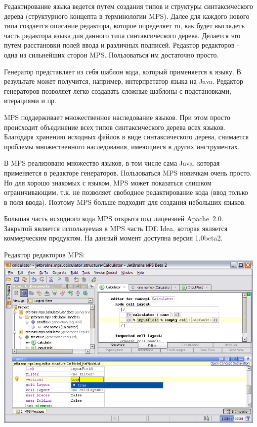 \documentclass[a4paper,12pt]{article}
\begin{document}
Редактирование языка ведется путем создания типов и структуры синтаксического
дерева (структурного концепта в терминологии MPS). Далее для каждого нового типа
создается описание редактора, которое определяет то, как будет выглядеть часть
редактора языка для данного типа синтаксического дерева. Делается это путем
расстановки полей ввода и различных подписей. Редактор редакторов - одна из
сильнейших сторон MPS. Пользоваться им достаточно просто.

Генератор представляет из себя шаблон кода, который применяется к языку. В
результате может получится, например, интерпретатор языка на Java. Редактор
генераторов позволяет легко создавать сложные шаблоны с подстановками,
итерациями и пр.

MPS поддерживает множественное наследование языков. При этом просто происходит 
объединение всех типов синтаксического дерева всех языков. Благодаря хранению
исходных файлов в виде синтаксического дерева, снимается проблемы
множественного наследования, имеющиеся в других инструментах.

В MPS реализовано множество языков, в том числе сама Java, которая применяется
в редакторе генераторов. Пользоваться MPS новичкам очень просто. Но для хорошо
знакомых с языком, MPS может показаться слишком ограничивающим, т.к. не позволяет
свободное редактирование кода (ввод только в поля ввода). Поэтому MPS больше
подходит для создания небольших языков.

Большая часть исходного кода MPS открыта под лицензией Apache~2.0. Закрытой
является используемая в MPS часть IDE Idea, которая является коммерческим
продуктом.
На данный момент доступна версия 1.0beta2.

\begin{center}
Редактор редакторов MPS:
\includegraphics[scale=0.4]{img/mps.png}
\end{center}
\end{document}
